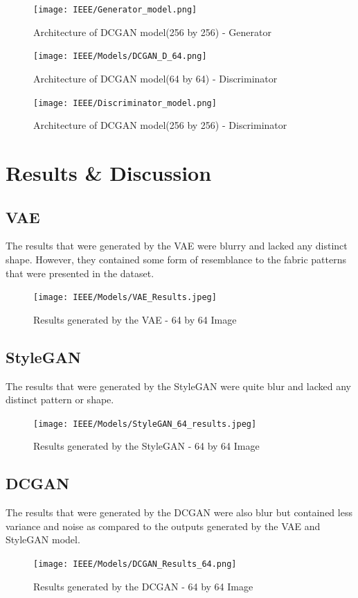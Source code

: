 \documentclass[conference]{IEEEtran}
\begin{document}
\begin{figure}[h!]
\centerline{\texttt{[image: IEEE/Generator\_model.png]}}
\caption{Architecture of DCGAN model(256 by 256) - Generator}
\label{fig}
\end{figure}
\newpage

\begin{figure}[h!]
\centerline{\texttt{[image: IEEE/Models/DCGAN\_D\_64.png]}}
\caption{Architecture of DCGAN model(64 by 64) - Discriminator}
\label{fig}
\end{figure}


\begin{figure}[h!]
\centerline{\texttt{[image: IEEE/Discriminator\_model.png]}}
\caption{Architecture of DCGAN model(256 by 256) - Discriminator}
\label{fig}
\end{figure}

\section{Results \& Discussion}
\subsection{VAE}
The results that were generated by the VAE were blurry and lacked any distinct shape. However, they contained some form of resemblance to the fabric patterns that were presented in the dataset.
\begin{figure}[h!]
\centerline{\texttt{[image: IEEE/Models/VAE\_Results.jpeg]}}
\caption{Results generated by the VAE - 64 by 64 Image}
\label{fig}
\end{figure}

\subsection{StyleGAN}
The results that were generated by the StyleGAN were quite blur and lacked any distinct pattern or shape.
\begin{figure}[h!]
\centerline{\texttt{[image: IEEE/Models/StyleGAN\_64\_results.jpeg]}}
\caption{Results generated by the StyleGAN - 64 by 64 Image}
\label{fig}
\end{figure}

\subsection{DCGAN}
The results that were generated by the DCGAN were also blur but contained less variance and noise as compared to the outputs generated by the VAE and StyleGAN model.
\begin{figure}[h!]
\centerline{\texttt{[image: IEEE/Models/DCGAN\_Results\_64.png]}}
\caption{Results generated by the DCGAN - 64 by 64 Image}
\label{fig}
\end{figure}
\end{document}
